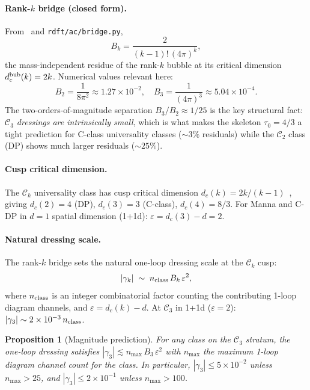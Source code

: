 \documentclass[10pt,a4paper,twocolumn]{article}
\theoremstyle{plain}
\newtheorem{proposition}[theorem]{Proposition}
\theoremstyle{definition}
\newcommand{\eps}{\varepsilon}
\newcommand{\Cstr}[1]{\mathcal{C}_{#1}}
\begin{document}
\paragraph{Rank-$k$ bridge (closed form).}
From~\citep[Prop.~4.3]{AmarteifioCFAC2026} and
\texttt{rdft/ac/bridge.py},
\begin{equation}\label{eq:bridge_rank_k}
  B_k = \frac{2}{(k-1)!\,(4\pi)^k},
\end{equation}
the mass-independent residue of the rank-$k$ bubble at its critical
dimension $d_c^{\rm bub}(k) = 2k$.  Numerical values relevant here:
\begin{equation}\label{eq:B_values}
  B_2 = \frac{1}{8\pi^2} \approx 1.27\times 10^{-2}, \quad
  B_3 = \frac{1}{(4\pi)^3} \approx 5.04\times 10^{-4}.
\end{equation}
The two-orders-of-magnitude separation $B_3/B_2 \approx 1/25$ is the
key structural fact: \emph{$\Cstr{3}$ dressings are intrinsically
small}, which is what makes the skeleton $\tau_0 = 4/3$ a tight
prediction for C-class universality classes ($\sim 3\%$ residuals)
while the $\Cstr{2}$ class (DP) shows much larger residuals
($\sim 25\%$).

\paragraph{Cusp critical dimension.}
The $\Cstr{k}$ universality class has cusp critical dimension
$d_c(k) = 2k/(k-1)$~\citep[\texttt{upper\_critical\_dim\_for\_cusp}]{bridge.py}, giving
$d_c(2) = 4$ (DP), $d_c(3) = 3$ (C-class), $d_c(4) = 8/3$.
For Manna and C-DP in $d=1$ spatial dimension (1+1d):
$\eps = d_c(3) - d = 2$.

\paragraph{Natural dressing scale.}
The rank-$k$ bridge sets the natural one-loop dressing scale at the
$\Cstr{k}$ cusp:
\begin{equation}\label{eq:gamma3_scale}
  |\gamma_k| \;\sim\; n_{\rm class}\,B_k\,\eps^2,
\end{equation}
where $n_{\rm class}$ is an integer combinatorial factor counting
the contributing 1-loop diagram channels, and
$\eps = d_c(k) - d$.  At $\Cstr{3}$ in 1+1d ($\eps = 2$):
$|\gamma_3| \sim 2\times 10^{-3}\,n_{\rm class}$.

\begin{proposition}[Magnitude prediction]\label{prop:magnitude}
For any class on the $\Cstr{3}$ stratum, the one-loop dressing
satisfies $|\gamma_3| \lesssim n_{\max}\,B_3\,\eps^2$ with $n_{\max}$
the maximum 1-loop diagram channel count for the class.  In particular,
$|\gamma_3| \le 5\times 10^{-2}$ unless $n_{\max} > 25$, and
$|\gamma_3| \le 2\times 10^{-1}$ unless $n_{\max} > 100$.
\end{proposition}
\end{document}
